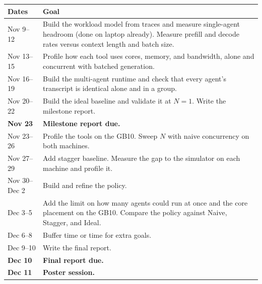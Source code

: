 \documentclass[11pt]{article}
\begin{document}
{\small
\begin{longtable}{@{}p{2.4cm}p{13.6cm}@{}}
\toprule
\textbf{Dates} & \textbf{Goal} \\
\midrule
\endhead
Nov 9--12 & Build the workload model from traces and measure single-agent headroom (done on laptop already). Measure prefill and decode rates versus context length and batch size. \\
Nov 13--15 & Profile how each tool uses cores, memory, and bandwidth, alone and concurrent with batched generation. \\
Nov 16--19 & Build the multi-agent runtime and check that every agent's transcript is identical alone and in a group. \\
Nov 20--22 & Build the ideal baseline and validate it at $N = 1$. Write the milestone report. \\
\textbf{Nov 23} & \textbf{Milestone report due.} \\
Nov 23--26 & Profile the tools on the GB10. Sweep $N$ with naive concurrency on both machines. \\
Nov 27--29 & Add stagger baseline. Measure the gap to the simulator on each machine and profile it. \\
Nov 30--Dec 2 & Build and refine the policy. \\
Dec 3--5 & Add the limit on how many agents could run at once and the core placement on the GB10. Compare the policy against Naive, Stagger, and Ideal. \\
Dec 6--8 & Buffer time or time for extra goals.
\\
Dec 9--10 & Write the final report. \\
\textbf{Dec 10} & \textbf{Final report due.} \\
\textbf{Dec 11} & \textbf{Poster session.} \\
\bottomrule
\end{longtable}}
 
{\small

}
 
\end{document}
